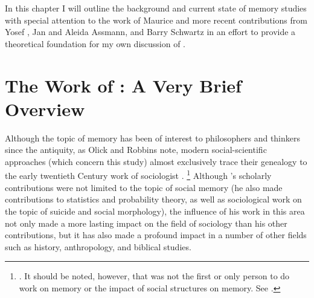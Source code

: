 In this chapter I will outline the background and current state of memory studies with special attention to the work of Maurice \halbwachs and more recent contributions from Yosef \yerushalmi, Jan and Aleida Assmann, and Barry Schwartz in an effort to provide a theoretical foundation for my own discussion of \rwb.

\section{The Work of \Halbwachs: A Very Brief Overview}

Although the topic of memory has been of interest to philosophers and thinkers since the antiquity,\autocite{carruthers_radstone-schwarz2011} as Olick and Robbins note, modern social-scientific approaches (which concern this study) almost exclusively trace their genealogy to the early twentieth Century work of sociologist \Halbwachs.%
%
\footnote{\cites[106]{olick-robbins_ars1998}. It should be noted, however, that \halbwachs was not the first or only person to do work on memory or the impact of social structures on memory. See \cite[8--36]{olick_olick-etal2011}.}
%
Although \halbwachs's scholarly contributions were not limited to the topic of social memory (he also made contributions to statistics and probability theory, as well as sociological work on the topic of suicide and social morphology), the influence of his work in this area not only made a more lasting impact on the field of sociology than his other contributions, but it has also made a profound impact in a number of other fields such as history, anthropology, and biblical studies.\autocite[13--20]{coser_halbwachs1992}

